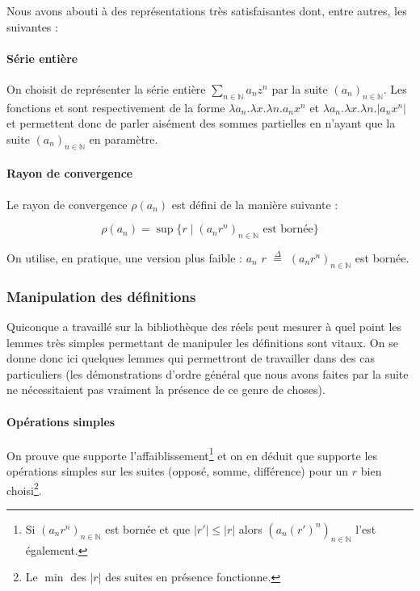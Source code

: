 Nous avons abouti à des représentations très satisfaisantes dont, entre autres, les suivantes :

\paragraph{Série entière} On choisit de représenter la série entière $\sum_{n\in \mathbb{N}} a_n z^n$ par la suite $\left(a_n\right)_{n\in \mathbb{N}}$. Les fonctions  et  sont respectivement de la forme $\lambda a_n.\lambda x.\lambda n.a_n x ^ n$ et $\lambda a_n.\lambda x.\lambda n.\left|a_n x ^ n\right|$ et permettent donc de parler aisément des sommes partielles en n'ayant que la suite $\left(a_n\right)_{n\in \mathbb{N}}$ en paramètre.

\paragraph{Rayon de convergence} Le rayon de convergence $\rho\left(a_n\right)$ est défini de la manière suivante :

$$\rho\left(a_n\right) = \sup \lbrace r \mid (a_n r^n)_{n\in \mathbb{N}} \text{ est bornée} \rbrace$$

\noindent On utilise, en pratique, une version plus faible :  $a_n$ $r$ $\stackrel{\Delta}{=}$ $\left(a_n r^n\right)_{n\in \mathbb{N}}$ est bornée.

\subsubsection{Manipulation des définitions}

Quiconque a travaillé sur la bibliothèque des réels peut mesurer à quel point les lemmes très simples permettant de manipuler les définitions sont vitaux. On se donne donc ici quelques lemmes qui permettront de travailler dans des cas particuliers (les démonstrations d'ordre général que nous avons faites par la suite ne nécessitaient pas vraiment la présence de ce genre de choses).

\paragraph{Opérations simples} On prouve que  supporte l'affaiblissement\footnote{Si $\left(a_n r^n\right)_{n\in \mathbb{N}}$ est bornée et que $|r'| \le |r|$ alors $\left(a_n (r')^n\right)_{n\in \mathbb{N}}$ l'est également.} et on en déduit que  supporte les opérations simples sur les suites (opposé, somme, différence) pour un $r$ bien choisi\footnote{Le $\min$ des $|r|$ des suites en présence fonctionne.}.

